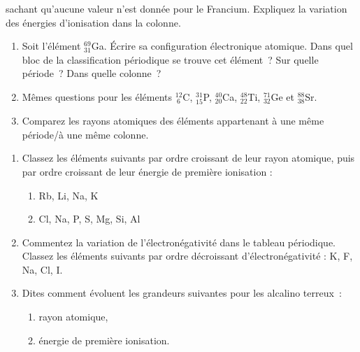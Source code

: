 sachant qu'aucune valeur n'est donn\'ee pour le Francium. Expliquez la variation des \'energies d'ionisation dans la colonne.
\begin{enumerate}[\bf 1)]
\item Soit l'\'el\'ement $_{31}^{69}$Ga. \'Ecrire sa configuration \'electronique atomique.
Dans quel bloc de la classification p\'eriodique se trouve cet \'el\'ement~?
Sur quelle p\'eriode~?
Dans quelle colonne~?
\item M\^emes questions pour les \'el\'ements $_{~6}^{12}$C, $_{15}^{31}$P, $_{20}^{40}$Ca, 
$_{22}^{48}$Ti, $_{32}^{71}$Ge et $_{38}^{88}$Sr.
\item Comparez les rayons atomiques des \'el\'ements appartenant \`a une m\^eme p\'eriode/\`a une m\^eme colonne.
\end{enumerate}
\begin{enumerate}[\bf 1)]
\item Classez les \'el\'ements suivants par ordre croissant de leur rayon atomique, puis par ordre croissant
de leur énergie de première ionisation :
\begin{enumerate}%
\item Rb, Li, Na, K
\item Cl, Na, P, S, Mg, Si, Al
\end{enumerate}
\item Commentez la variation de l'\'electron\'egativit\'e dans le tableau p\'eriodique. Classez les \'el\'ements suivants par ordre d\'ecroissant d'\'electron\'egativit\'e : K, F, Na, Cl, I.
\item Dites comment \'evoluent les grandeurs suivantes pour les alcalino terreux~:
\begin{enumerate}%
\item rayon atomique,
\item \'energie de premi\`ere ionisation.
\end{enumerate}
\end{enumerate}
%
